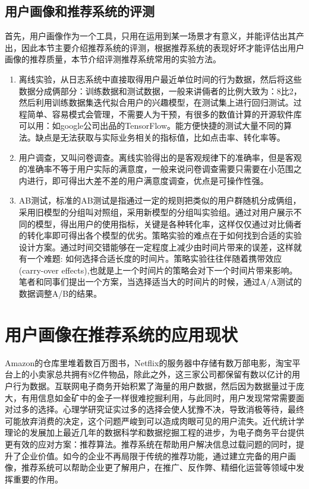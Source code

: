 		\subsection{用户画像和推荐系统的评测}
		首先，用户画像作为一个工具，只用在运用到某一场景才有意义，并能评估出其产出，因此本节主要介绍推荐系统的评测，根据推荐系统的表现好坏才能评估出用户画像的推荐质量，本节介绍评测推荐系统常用的实验方法。
			\begin{enumerate}[(1)]
			\item 离线实验，从日志系统中直接取得用户最近单位时间的行为数据，然后将这些数据分成俩部分：训练数据和测试数据，一般来讲倆者的比例大致为：8比2，然后利用训练数据集迭代拟合用户的兴趣模型，在测试集上进行回归测试。过程简单、容易模式会管理，不需要人为干预，有很多的数值计算的开源软件库可以用：如google公司出品的TensorFlow。能方便快捷的测试大量不同的算法。缺点是无法获取与实际业务相关的指标值，比如点击率、转化率等。
			\item 用户调查，又叫问卷调查。离线实验得出的是客观规律下的准确率，但是客观的准确率不等于用户实际的满意度，一般来说问卷调查需要只需要在小范围之内进行，即可得出大差不差的用户满意度调查，优点是可操作性强。
			\item AB测试，标准的AB测试是指通过一定的规则把类似的用户群随机分成俩组，采用旧模型的分组叫对照组，采用新模型的分组叫实验组。通过对用户展示不同的模型，得出用户的使用指标，关键是各种转化率，这样仅仅通过对比倆者的转化率即可得出各个模型的优劣。策略实验的难点在于如何找到合适的实验设计方案。通过时间交错能够在一定程度上减少由时间片带来的误差，这样就有一个难题:  如何选择合适长度的时间片。策略实验往往伴随着携带效应(carry-over effects),也就是上一个时间片的策略会对下一个时间片带来影响。笔者和同事们提出一个方案，当选择适当大的时间片的时候，通过A/A测试的数据调整A/B的结果。
			\end{enumerate}

	\section{用户画像在推荐系统的应用现状}
	Amazon的仓库里堆着数百万图书，Netflix的服务器中存储有数万部电影，淘宝平台上的小卖家总共拥有8亿件物品，除此之外，这三家公司都保留有数以亿计的用户行为数据。互联网电子商务开始积累了海量的用户数据，然后因为数据量过于庞大，有用信息如金矿中的金子一样很难挖掘利用，与此同时，用户发现常常需要面对过多的选择。心理学研究证实过多的选择会使人犹豫不决，导致消极等待，最终可能放弃消费的决定，这个问题严峻到可以造成肉眼可见的用户流失。近代统计学理论的发展加上最近几年的数据科学和数据挖掘工程的进步，为电子商务平台提供更有效的应对方案：推荐算法。推荐系统在帮助用户解决信息过载问题的同时，提升了企业价值。如今的企业不再局限于传统的推荐功能，通过建立完备的用户画像，推荐系统可以帮助企业更了解用户，在推广、反作弊、精细化运营等领域中发挥重要的作用。

